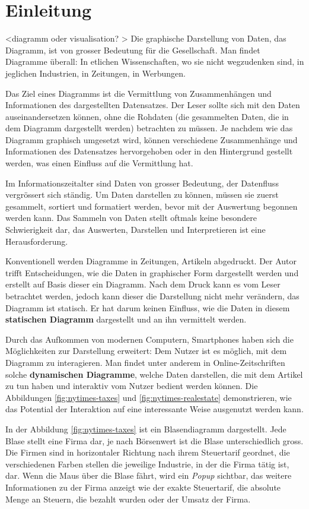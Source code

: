 \chapter{Einleitung}
<diagramm oder visualisation? \cite[seite 130]{viz}>
Die graphische Darstellung von Daten, das Diagramm, ist von grosser Bedeutung für die Gesellschaft. Man findet Diagramme überall: In etlichen Wissenschaften, wo sie nicht wegzudenken sind, in jeglichen Industrien, in Zeitungen, in Werbungen.

Das Ziel eines Diagramms ist die Vermittlung von Zusammenhängen und Informationen des dargestellten Datensatzes. Der Leser sollte sich mit den Daten auseinandersetzen können, ohne die Rohdaten (die gesammelten Daten, die in dem Diagramm dargestellt werden) betrachten zu müssen. Je nachdem wie das Diagramm graphisch umgesetzt wird, können verschiedene Zusammenhänge und Informationen des Datensatzes hervorgehoben oder in den Hintergrund gestellt werden, was einen Einfluss auf die Vermittlung hat.

Im Informationszeitalter sind Daten von grosser Bedeutung, der Datenfluss vergrössert sich ständig. Um Daten darstellen zu können, müssen sie zuerst gesammelt, sortiert und formatiert werden, bevor mit der Auswertung begonnen werden kann. Das Sammeln von Daten stellt oftmals keine besondere Schwierigkeit dar, das Auswerten, Darstellen und Interpretieren ist eine Herausforderung.

Konventionell werden Diagramme in Zeitungen, Artikeln abgedruckt. Der Autor trifft Entscheidungen, wie die Daten in graphischer Form dargestellt werden und erstellt auf Basis dieser ein Diagramm. Nach dem Druck kann es vom Leser betrachtet werden, jedoch kann dieser die Darstellung nicht mehr verändern, das Diagramm ist statisch. Er hat darum keinen Einfluss, wie die Daten in diesem \textbf{statischen Diagramm} dargestellt und an ihn vermittelt werden.

Durch das Aufkommen von modernen Computern, Smartphones haben sich die Möglichkeiten zur Darstellung erweitert: Dem Nutzer ist es möglich, mit dem Diagramm zu interagieren. Man findet unter anderem in Online-Zeitschriften solche \textbf{dynamischen Diagramme}, welche Daten darstellen, die mit dem Artikel zu tun haben und interaktiv vom Nutzer bedient werden können. Die Abbildungen \ref{fig:nytimes-taxes} und \ref{fig:nytimes-realestate} demonstrieren, wie das Potential der Interaktion auf eine interessante Weise ausgenutzt werden kann.

In der Abbildung \ref{fig:nytimes-taxes} ist ein Blasendiagramm dargestellt. Jede Blase stellt eine Firma dar, je nach Börsenwert ist die Blase unterschiedlich gross. Die Firmen sind in horizontaler Richtung nach ihrem Steuertarif geordnet, die verschiedenen Farben stellen die jeweilige Industrie, in der die Firma tätig ist, dar. Wenn die Maus über die Blase fährt, wird ein \textit{Popup} sichtbar, das weitere Informationen zu der Firma anzeigt wie der exakte Steuertarif, die absolute Menge an Steuern, die bezahlt wurden oder der Umsatz der Firma.

